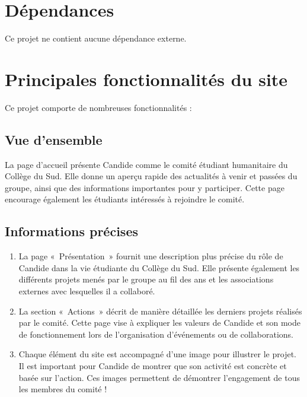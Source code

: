 \documentclass[a4,10pt,french]{sphinxmanual}
\begin{document}
\section{Dépendances}
\label{\detokenize{chapitre-01:dependances}}
\sphinxAtStartPar
Ce projet ne contient aucune dépendance externe.


\section{Principales fonctionnalités du site}
\label{\detokenize{chapitre-01:principales-fonctionnalites-du-site}}
\sphinxAtStartPar
Ce projet comporte de nombreuses fonctionnalités :


\subsection{Vue d’ensemble}
\label{\detokenize{chapitre-01:vue-densemble}}
\sphinxAtStartPar
La page d’accueil présente Candide comme le comité étudiant humanitaire du Collège du Sud. Elle donne un aperçu rapide des actualités à venir et passées du groupe, ainsi que des informations importantes pour y participer. Cette page encourage également les étudiants intéressés à rejoindre le comité.


\subsection{Informations précises}
\label{\detokenize{chapitre-01:informations-precises}}\begin{enumerate}
%
\item {} 
\sphinxAtStartPar
La page « Présentation » fournit une description plus précise du rôle de Candide dans la vie étudiante du Collège du Sud. Elle présente également les différents projets menés par le groupe au fil des ans et les associations externes avec lesquelles il a collaboré.

\item {} 
\sphinxAtStartPar
La section « Actions » décrit de manière détaillée les derniers projets réalisés par le comité. Cette page vise à expliquer les valeurs de Candide et son mode de fonctionnement lors de l’organisation d’événements ou de collaborations.

\item {} 
\sphinxAtStartPar
Chaque élément du site est accompagné d’une image pour illustrer le projet. Il est important pour Candide de montrer que son activité est concrète et basée sur l’action. Ces images permettent de démontrer l’engagement de tous les membres du comité !

\end{enumerate}
\end{document}
